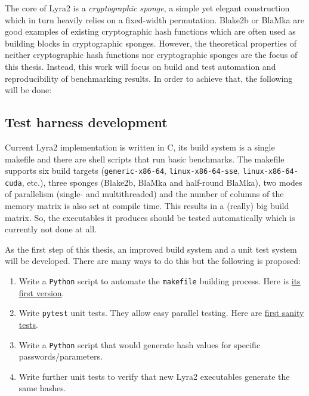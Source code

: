 \documentclass[a4paper,10pt,english]{INSOexpose}
\begin{document}
The core of Lyra2 \cite{Andrade:2016:Lyra2} is a \emph{cryptographic sponge}, a simple yet elegant construction which in turn heavily relies on a fixed-width permutation. Blake2b \cite{Aumasson:2013:BLAKE2} or BlaMka \cite{Andrade:2016:Lyra2} are good examples of existing cryptographic hash functions which are often used as building blocks in cryptographic sponges. However, the theoretical properties of neither cryptographic hash functions nor cryptographic sponges are the focus of this thesis. Instead, this work will focus on build and test automation and reproducibility of benchmarking results. In order to achieve that, the following will be done:

\subsection{Test harness development}
\label{subsection:test-harness}

Current Lyra2 implementation is written in C, its build system is a single makefile and there are shell scripts that run basic benchmarks. The makefile supports six build targets (\texttt{generic-x86-64}, \texttt{linux-x86-64-sse}, \texttt{linux-x86-64-cuda}, etc.), three sponges (Blake2b, BlaMka and half-round BlaMka), two modes of parallelism (single- and multithreaded) and the number of columns of the memory matrix is also set at compile time. This results in a (really) big build matrix. So, the executables it produces should be tested automatically which is currently not done at all.

As the first step of this thesis, an improved build system and a unit test system will be developed. There are many ways to do this but the following is proposed:

\begin{enumerate}
\item Write a \texttt{Python} script to automate the \texttt{makefile} building process. Here is
  \href{https://github.com/all3fox/Lyra/blob/91cc07252ac65370134b4b02cce3cb29fbf3efc1/Lyra2/tests/build_lyra2.py}{its first version}.
\item Write \texttt{pytest} unit tests. They allow easy parallel testing. Here are \href{https://github.com/all3fox/Lyra/blob/91cc07252ac65370134b4b02cce3cb29fbf3efc1/Lyra2/tests/build_lyra2.py}{first sanity tests}.
\item Write a \texttt{Python} script that would generate hash values for specific passwords/parameters.
\item Write further unit tests to verify that new Lyra2 executables generate the same hashes.
\end{enumerate}
\end{document}
